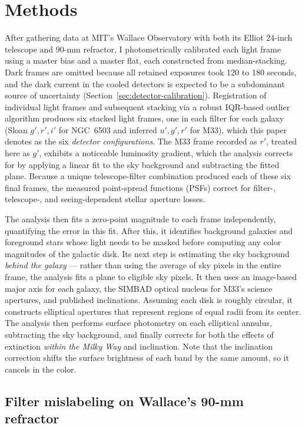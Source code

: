 \section{Methods}
\label{sec:methods}

After gathering data at MIT's Wallace Observatory with both its Elliot 24-inch telescope and 90-mm refractor, I photometrically calibrated each light frame using a master bias and a master flat, each constructed from median-stacking. Dark frames are omitted because all retained exposures took 120 to 180 seconds, and the dark current in the cooled detectors is expected to be a subdominant source of uncertainty (Section~\ref{sec:detector-calibration}). Registration of individual light frames and subsequent stacking via a robust IQR-based outlier algorithm produces six stacked light frames, one in each filter for each galaxy (Sloan $g',r',i'$ for NGC~6503 and inferred $u',g',r'$ for M33), which this paper denotes as the six \textit{detector configurations}. The M33 frame recorded as $r'$, treated here as $g'$, exhibits a noticeable luminosity gradient, which the analysis corrects for by applying a linear fit to the sky background and subtracting the fitted plane. Because a unique telescope-filter combination produced each of these six final frames, the measured point-spread functions (PSFs) correct for filter-, telescope-, and seeing-dependent stellar aperture losses.

The analysis then fits a zero-point magnitude to each frame independently, quantifying the error in this fit. After this, it identifies background galaxies and foreground stars whose light needs to be masked before computing any color magnitudes of the galactic disk. Its next step is estimating the sky background \textit{behind the galaxy} --- rather than using the average of sky pixels in the entire frame, the analysis fits a plane to eligible sky pixels. It then uses an image-based major axis for each galaxy, the SIMBAD optical nucleus for M33's science apertures, and published inclinations. Assuming each disk is roughly circular, it constructs elliptical apertures that represent regions of equal radii from its center. The analysis then performs surface photometry on each elliptical annulus, subtracting the sky background, and finally corrects for both the effects of extinction \textit{within the Milky Way} and inclination. Note that the inclination correction shifts the surface brightness of each band by the same amount, so it cancels in the color.

\subsection{Filter mislabeling on Wallace's 90-mm refractor}
\label{sec:filter-mapping}

